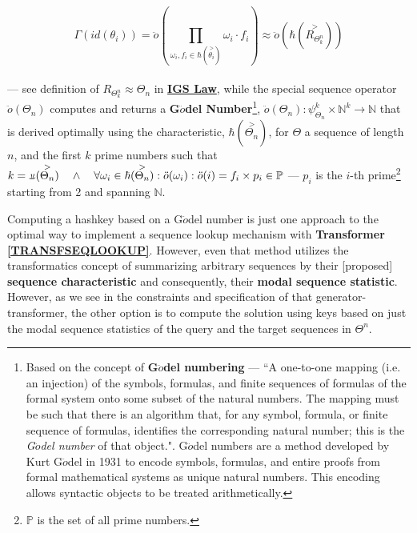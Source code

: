 \documentclass[a4paper, 18pt]{book} %
\newcommand{\invpi}{\rotatebox[origin=c]{180}{$\pi$}}
\begin{document}
\begin{equation}
\label{EQHASHKEYSEQ}
 \Gamma (id(\theta_i)) = \ddot{o}(\prod\limits_{\omega_i,f_i \in \hbar(\overset{>}{\theta_i})} \omega_i\cdot f_i) \approx \ddot{o}(\hbar(\overset{>}{R_{\Theta^n_k}}))
\end{equation}\\



 --- see definition of $R_{\Theta^n_k} \approx \Theta_n$ in \textbf{\hyperref[LAWGDL]{IGS Law}}, while the special sequence operator $\ddot{o}(\Theta_n)$ computes and returns a \textbf{G$\ddot{o}$del Number}\cite{illingworth1996computing}\footnote{Based on the concept of \textbf{G$\ddot{o}$del numbering} --- ``A one-to-one mapping (i.e. an injection) of the symbols, formulas, and finite sequences of formulas of the formal system onto some subset of the natural numbers. The mapping must be such that there is an algorithm that, for any symbol, formula, or finite sequence of formulas, identifies the corresponding natural number; this is the \textit{G$\ddot{o}$del number} of that object."\cite{illingworth1996computing}. G$\ddot{o}$del numbers are a method developed by Kurt G$\ddot{o}$del in 1931\cite{godel1931} to encode symbols, formulas, and entire proofs from formal mathematical systems as unique natural numbers. This encoding allows syntactic objects to be treated arithmetically\cite{godel1931english}.}, $\ddot{o}(\Theta_n): \psi_{\Theta_n}^k \times\mathbb{N}^k \rightarrow \mathbb{N}$ that is derived optimally using the characteristic, $\hbar(\overset{>}{\Theta_n})$, for $\Theta$ a sequence of length $n$, and the first $k$ prime numbers such that $k = \invpi(\overset{>}{\Theta_n}) \quad \land \quad \forall \omega_i \in \hbar(\overset{>}{\Theta_n}): \ddot{o}(\omega_i) : \ddot{o}(i) = f_i \times p_i \in \mathbb{P}$ --- $p_i$ is the $i$-th prime\footnote{$\mathbb{P}$ is the set of all prime numbers.} starting from 2 and spanning $\mathbb{N}$.
 
 Computing a hashkey based on a G$\ddot{o}$del number is just one approach to the optimal way to implement a sequence lookup mechanism with \textbf{Transformer \ref{TRANSFSEQLOOKUP}}. However, even that method utilizes the transformatics concept of summarizing arbitrary sequences by their [proposed] \textbf{sequence characteristic} and consequently, their \textbf{modal sequence statistic}. However, as we see in the constraints and specification of that generator-transformer, the other option is to compute the solution using keys based on just the modal sequence statistics of the query and the target sequences in $\Theta^n$.
\end{document}
